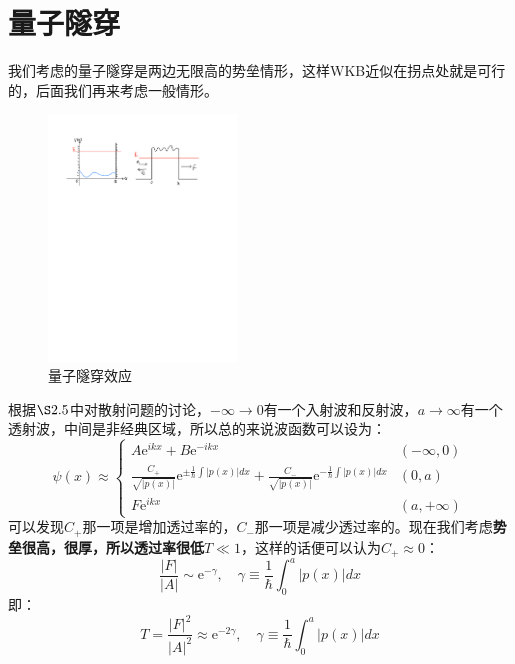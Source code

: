 \documentclass[a4paper,zihao=-4,linespread=1]{ctexrep}
\begin{document}
    \section{量子隧穿}
    我们考虑的量子隧穿是两边无限高的势垒情形，这样WKB近似在拐点处就是可行的，后面我们再来考虑一般情形。
    \begin{figure}[h]
        \centering
        \includegraphics[width=5cm]{fig/9-3.pdf}
        \caption{量子隧穿效应}
        \label{fig:9.3}
    \end{figure}
    根据$\S 2.5$中对散射问题的讨论，$-\infty\to 0$有一个入射波和反射波，$a\to\infty$有一个透射波，中间是非经典区域，所以总的来说波函数可以设为：
    \begin{equation}
        \psi(x)\approx\begin{cases}
            A\mathrm{e}^{ikx}+B\mathrm{e}^{-ikx}&(-\infty,0)\\
            \frac{C_+}{\sqrt{|p(x)|}}\mathrm{e}^{\pm\frac{1}{\hbar}\int |p(x)|dx}+\frac{C_-}{\sqrt{|p(x)|}}\mathrm{e}^{-\frac{1}{\hbar}\int |p(x)|dx}& (0,a)\\
            F\mathrm{e}^{ikx}&(a,+\infty)
        \end{cases}
    \end{equation}
    可以发现$C_+$那一项是增加透过率的，$C_-$那一项是减少透过率的。现在我们考虑\textbf{势垒很高，很厚，所以透过率很低$T\ll 1$}，这样的话便可以认为$C_+\approx 0$：
    \[\frac{|F|}{|A|}\sim \mathrm{e}^{-\gamma},\quad\gamma\equiv\frac{1}{\hbar}\int_{0}^{a}|p(x)|dx\]
    即：
    \begin{equation}
        \label{eq:9.9}
        \boxed{
            T=\frac{|F|^2}{|A|^2}\approx \mathrm{e}^{-2\gamma},\quad\gamma\equiv\frac{1}{\hbar}\int_{0}^{a}|p(x)|dx
        }
    \end{equation}
    
\end{document}
